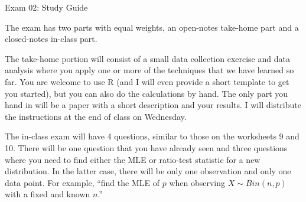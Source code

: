 \documentclass{tufte-handout}
\begin{document}
\justify

{\LARGE Exam 02: Study Guide}

\vspace*{18pt}

\noindent
The exam has two parts with equal weights, an open-notes
take-home part and a closed-notes in-class part.

\vspace*{18pt}

\noindent
The take-home
portion will consist of a small data collection exercise and
data analysis where you apply one or more of the techniques that
we have learned so far. You are welcome to use R (and I will 
even provide a short template to get you started), but you
can also do the calculations by hand. The only part you hand
in will be a paper with a short description and your results.
I will distribute the instructions at the end of class on Wednesday.

\vspace*{18pt}

\noindent
The in-class exam will have 4 questions, similar to those on the
worksheets 9 and 10. There will be one question that you have 
already seen and three questions where you need to find either the
MLE or ratio-test statistic for a new distribution. In the latter
case, there will be only one observation and only one data point.
For example, ``find the MLE of $p$ when observing $X \sim Bin(n, p)$
with a fixed and known $n$.'' 
\end{document}
